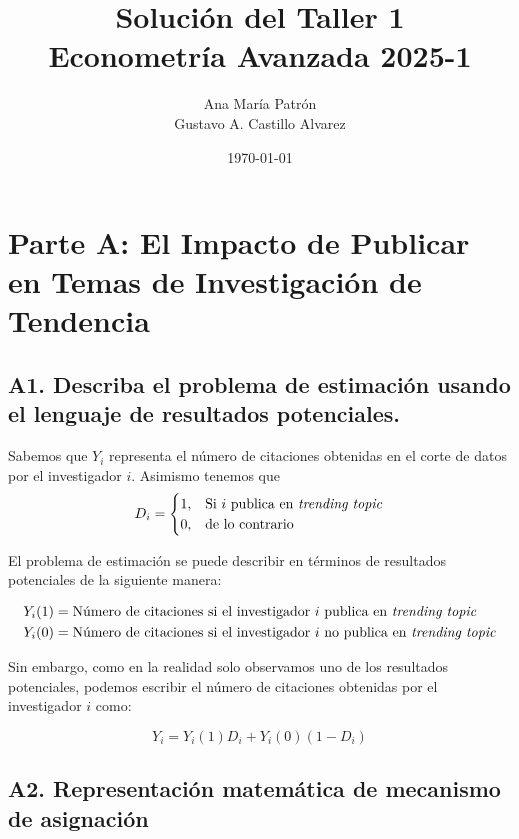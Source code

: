 \documentclass[12pt, letter]{article}
\title{Solución del Taller 1 \\ \large Econometría Avanzada 2025-1}
\author{Ana María Patrón \\
 Gustavo A. Castillo Alvarez}
\date{\today}
\begin{document}
\maketitle

\tableofcontents
\newpage




\section{Parte A: El Impacto de Publicar en Temas de Investigación de Tendencia}
\subsection*{A1. Describa el problema de estimación usando el lenguaje de resultados potenciales.}

Sabemos que $Y_i$ representa el número de citaciones obtenidas en el corte de datos por el investigador $i$. Asimismo tenemos que 
$$
D_i=\begin{cases}
        1, & \text{Si $i$ publica en \textit{trending topic}}\\
        0, & \text{de lo contrario}
    \end{cases}
$$

El problema de estimación se puede describir en términos de resultados potenciales de la siguiente manera:

\begin{align*}
    Y_i(1) &= \text{Número de citaciones si el investigador $i$ publica en \textit{trending topic}} \\
    Y_i(0) &= \text{Número de citaciones si el investigador $i$ no publica en \textit{trending topic}}
\end{align*}

Sin embargo, como en la realidad solo observamos uno de los resultados potenciales, podemos escribir el número de citaciones obtenidas por el investigador $i$ como:

$$
Y_i = Y_i(1)D_i + Y_i(0)(1-D_i)
$$




\subsection{A2. Representación matemática de mecanismo de asignación}
\end{document}
